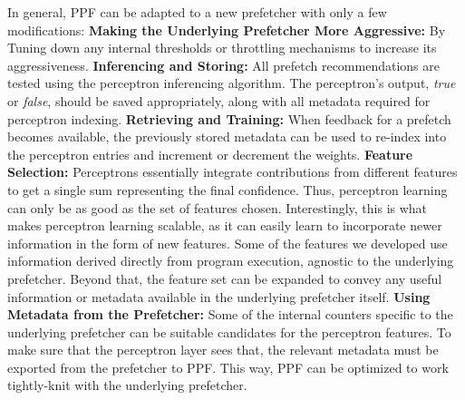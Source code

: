 \noindent In general, PPF can be adapted to a {new prefetcher} with only a
few modifications:
\newline
\newline
\noindent \textbf{Making the {Underlying} Prefetcher More Aggressive:} By Tuning 
down any internal thresholds or throttling mechanisms to increase its
aggressiveness.
\newline
\newline
\noindent \textbf{Inferencing and Storing:} All prefetch
recommendations are tested using the perceptron inferencing algorithm.
The perceptron's output, \textit{true} or \textit{false}, should be
saved appropriately, along with all metadata required for perceptron
indexing.
\newline
\newline
\noindent \textbf{Retrieving and Training:} When feedback for a
prefetch becomes available, the previously stored metadata can be used
to re-index into the perceptron entries and increment or decrement the
weights.
\newline
\newline
\noindent \textbf{Feature Selection:} Perceptrons essentially
integrate contributions from different features to get a single sum
representing the final confidence.  Thus, perceptron learning can only
be as good as the set of features chosen.  Interestingly, this is what
makes perceptron learning scalable, as it can easily learn to
incorporate newer information in the form of new features.  Some of
the features we developed use information derived directly from
program execution, agnostic to the {underlying} prefetcher.  Beyond that,
the feature set can be expanded to convey any useful information or
metadata available in the {underlying} prefetcher itself.
\newline
\newline
\noindent \textbf{Using Metadata from the Prefetcher:} Some of the 
internal counters specific to the underlying prefetcher can be suitable candidates
for the perceptron features. To make sure that the perceptron layer sees that, 
the relevant metadata must be exported from the prefetcher to PPF. This way,
PPF can be optimized to work tightly-knit with the {underlying} prefetcher.
